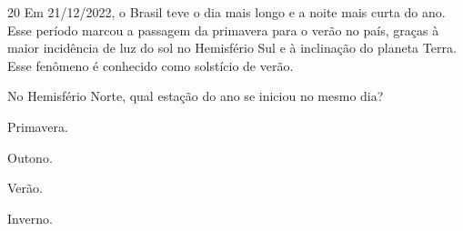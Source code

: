 \num{20} Em 21/12/2022, o Brasil teve o dia mais longo e a noite
mais curta do ano. Esse período marcou a passagem da primavera para o
verão no país, graças à maior incidência de luz do sol no Hemisfério Sul
e à inclinação do planeta Terra. Esse fenômeno é conhecido como
solstício de verão.

No Hemisfério Norte, qual estação do ano se iniciou no mesmo dia?

\begin{minipage}{.5\textwidth}
\begin{escolha}
\item Primavera.

\item Outono.

\item Verão.

\item Inverno.
\end{escolha}
\end{minipage}
